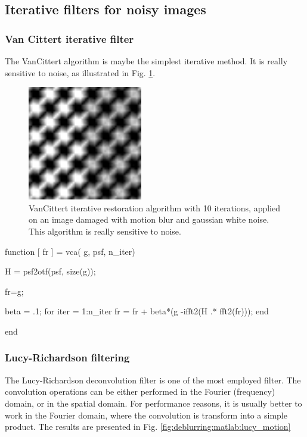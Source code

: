 \newpage
\subsection{Iterative filters for noisy images}
\subsubsection{Van Cittert iterative filter}
The VanCittert algorithm is maybe the simplest iterative method. It is really sensitive to noise, as illustrated in Fig. \ref{fig:deblurring:matlab:vancittert_motion_10}.

\begin{figure}[htbp]
 \centering
 \includegraphics[width=5cm]{vancittert_motion_10.png}
 \caption{VanCittert iterative restoration algorithm with 10 iterations, applied on an image damaged with motion blur and gaussian white noise. This algorithm is really sensitive to noise.}
 \label{fig:deblurring:matlab:vancittert_motion_10}
\end{figure}

\begin{matlab}
function [ fr ] = vca( g, psf, n_iter)
%

H = psf2otf(psf, size(g));

fr=g;

beta = .1; %
for iter = 1:n_iter
    fr = fr + beta*(g -ifft2(H .* fft2(fr)));
end

end
\end{matlab}

\subsubsection{Lucy-Richardson filtering}

The Lucy-Richardson deconvolution filter is one of the most employed filter. The convolution operations can be either performed in the Fourier (frequency) domain, or in the spatial domain. For performance reasons, it is usually better to work in the Fourier domain, where the convolution is transform into a simple product. The results are presented in Fig. \ref{fig:deblurring:matlab:lucy_motion}

